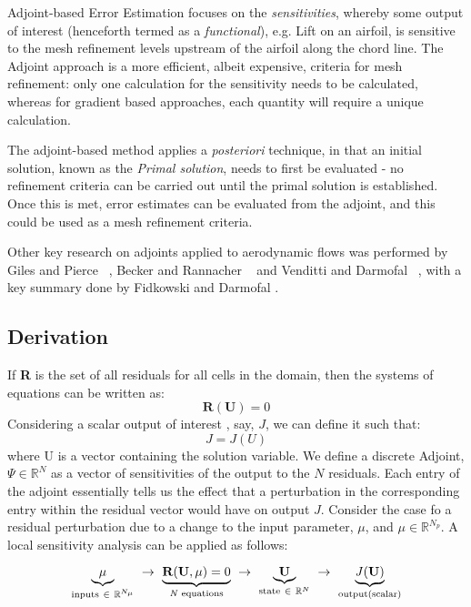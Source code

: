 Adjoint-based Error Estimation focuses on the \textit{sensitivities}, whereby some output of interest (henceforth termed as a \textit{functional}), e.g. Lift on an airfoil, is sensitive to the mesh refinement levels upstream of the airfoil along the chord line. The Adjoint approach is a more efficient, albeit expensive, criteria for mesh refinement: only one calculation for the sensitivity needs to be calculated, whereas for gradient based approaches, each quantity will require a unique calculation.\par

The adjoint-based method applies a \textit{posteriori} technique, in that an initial solution, known as the \textit{Primal solution}, needs to first be evaluated - no refinement criteria can be carried out until the primal solution is established. Once this is met, error estimates can be evaluated from the adjoint, and this could be used as a mesh refinement criteria. \par

Other key research on adjoints applied to aerodynamic flows was performed by Giles and Pierce ~\cite{Giles:2000}, Becker and Rannacher ~\cite{Becker:2001} and Venditti and Darmofal ~\cite{Venditti:2003}, with a key summary done by Fidkowski and Darmofal \cite{Fidkowski:2011}.


\subsection{Derivation}
If \textbf{R} is the set of all residuals for all cells in the domain, then the systems of equations can be written as:
\begin{equation}
\textbf{R}(\textbf{U}) = 0
\end{equation}
Considering a scalar output of interest \cite{Fidkowski:2013}, say, $J$, we can define it such that:
\begin{equation}
J = J(U)
\end{equation}
where U is a vector containing the solution variable. We define a discrete Adjoint, $\Psi \in \mathbb{R}^N$ as a vector of sensitivities of the output to the $N$ residuals. Each entry of the adjoint essentially tells us the effect that a perturbation in the corresponding entry within the residual vector would have on output $J$. Consider the case fo a residual perturbation due to a change to the input parameter, $\mu$, and $\mu \in \mathbb{R}^{N_p}$. A local sensitivity analysis can be applied as follows:\par
\begin{equation} \label{eqn:chain}
\underbrace{\mu}_{\text{inputs} ~\in~\mathbb{R}^{N_\mu}} ~\to~ \underbrace{\textbf{R}(\textbf{U},\textbf{$\mu$}) = 0}_{\text{\textit{N} equations}} ~ \to ~ \underbrace{\textbf{U}}_{\text{state} ~\in~ \mathbb{R}^N} ~\to~ \underbrace{\text{\textit{J}(\textbf{U})}}_\text{output(scalar)} 
\end{equation}

